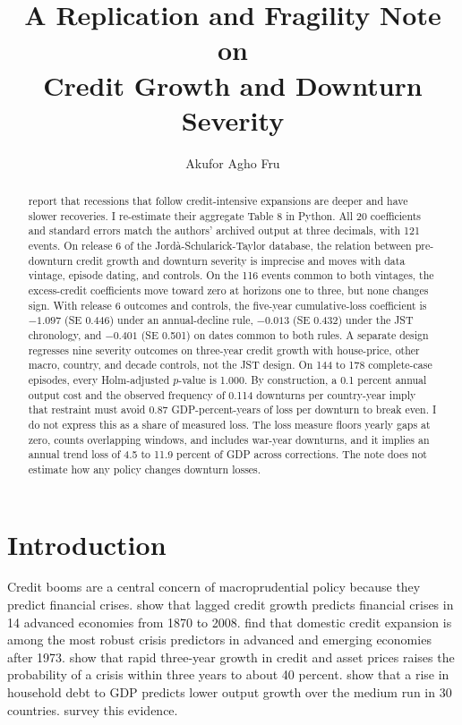 \documentclass[11pt]{article}
\title{A Replication and Fragility Note on\\Credit Growth and Downturn Severity}
\author{Akufor Agho Fru}
\date{}
\begin{document}
\maketitle

\begin{abstract}
\citet{jst2013} report that recessions that follow credit-intensive expansions are deeper and
have slower recoveries. I re-estimate their aggregate Table 8 in Python. All 20 coefficients
and standard errors match the authors' archived output at three decimals, with 121 events.
On release 6 of the Jord\`a-Schularick-Taylor database, the relation between pre-downturn
credit growth and downturn severity is imprecise and moves with data vintage, episode
dating, and controls. On the 116 events common to both vintages, the excess-credit
coefficients move toward zero at horizons one to three, but none changes sign. With release
6 outcomes and controls, the five-year cumulative-loss coefficient is $-1.097$ (SE 0.446)
under an annual-decline rule, $-0.013$ (SE 0.432) under the JST chronology, and $-0.401$
(SE 0.501) on dates common to both rules. A separate design regresses nine severity
outcomes on three-year credit growth with house-price, other macro, country, and decade
controls, not the JST design. On 144 to 178 complete-case episodes, every Holm-adjusted
$p$-value is 1.000. By construction, a 0.1 percent annual output cost
and the observed frequency of 0.114 downturns per country-year imply that restraint must
avoid 0.87 GDP-percent-years of loss per downturn to break even. I do not express this as a
share of measured loss. The loss measure floors yearly gaps at zero, counts overlapping
windows, and includes war-year downturns, and it implies an annual trend loss of 4.5 to 11.9
percent of GDP across corrections. The note does not estimate how any policy changes
downturn losses.
\end{abstract}

\section{Introduction}
Credit booms are a central concern of macroprudential policy because they predict financial
crises. \citet{schularicktaylor2012} show that lagged credit growth predicts financial crises
in 14 advanced economies from 1870 to 2008. \citet{gourinchasobstfeld2012} find that domestic
credit expansion is among the most robust crisis predictors in advanced and emerging
economies after 1973. \citet{greenwood2022} show that rapid three-year growth in credit and
asset prices raises the probability of a crisis within three years to about 40 percent.
\citet{msv2017} show that a rise in household debt to GDP predicts lower output growth over
the medium run in 30 countries. \citet{sufitaylor2022} survey this evidence.
\end{document}
